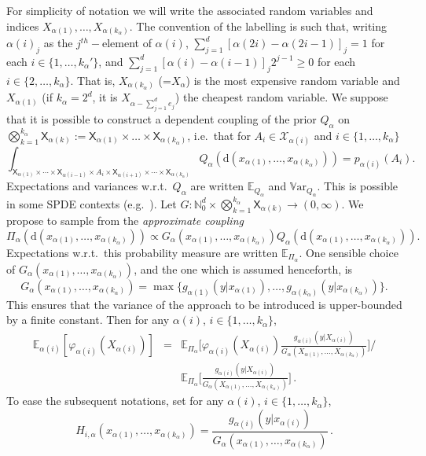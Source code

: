 \documentclass[english]{article}
\newcommand{\dif}{\mathrm{d}}
\begin{document}
For simplicity of notation we will write the associated random variables and indices $X_{\alpha(1)},\dots,X_{\alpha(k_{\alpha})}$.
The convention of the labelling is such that, writing $\alpha(i)_j$ as the $j^{th}-$element of $\alpha(i)$, 
$\sum_{j=1}^d[\alpha(2i)-\alpha(2i-1)]_j=1$ for each $i\in\{1,\dots,k_{\alpha}'\}$, and 
$\sum_{j=1}^d[\alpha(i)-\alpha(i-1)]_j2^{j-1}\geq 0$ for each $i\in\{2,\dots,k_{\alpha}\}$.
That is, $X_{\alpha(k_{\alpha})}$ (=$X_{\alpha}$)
is the most expensive random variable and $X_{\alpha(1)}$ (if $k_{\alpha}=2^d$, it is $X_{\alpha-\sum_{j=1}^d e_j}$) the cheapest random variable.
We suppose that it is possible to construct a dependent coupling of the prior 
$Q_\alpha$ on 
$\bigotimes_{k=1}^{k_{\alpha}} \mathsf{X}_{\alpha(k)} := \mathsf{X}_{\alpha(1)} \times \dots \times \mathsf{X}_{\alpha(k_\alpha)}$,
i.e.~that for $A_i\in\mathcal{X}_{\alpha(i)}$ and $i\in\{1,\dots,k_{\alpha}\}$
$$
\int_{\mathsf{X}_{\alpha(1)}\times\cdots\times\mathsf{X}_{\alpha(i-1)}\times A_i\times 
\mathsf{X}_{\alpha(i+1)}\times\cdots\times\mathsf{X}_{\alpha(k_{\alpha})}} Q_\alpha(\dif (x_{\alpha(1)},\dots,x_{\alpha({k_{\alpha}})})) = 
p_{\alpha(i)}(A_i).
$$
Expectations and variances w.r.t.~$Q_\alpha$ are written $\mathbb{E}_{Q_\alpha}$ and 
$\mathbb{V}\textrm{ar}_{Q_\alpha}$.
This is possible in some SPDE contexts (e.g.~\cite{spde_disc}). 
Let $G:\mathbb{N}_0^d\times \bigotimes_{k=1}^{k_{\alpha}} \mathsf{X}_{\alpha(k)}\rightarrow (0,\infty)$. %
We propose to sample from the {\it approximate coupling} 
$$
\Pi_{\alpha}(\dif (x_{\alpha(1)},\dots,x_{\alpha(k_{\alpha})})) \propto G_{\alpha}(x_{\alpha(1)},\dots,x_{\alpha(k_{\alpha})}) Q_\alpha(\dif (x_{\alpha(1)},\dots,x_{\alpha(k_{\alpha})})).
$$
Expectations w.r.t.~this probability measure are written $\mathbb{E}_{\Pi_{\alpha}}$.
One sensible choice of $G_{\alpha}(x_{\alpha(1)},\dots,x_{\alpha(k_{\alpha})})$, 
and the one which is assumed henceforth, is
$$
G_{\alpha}(x_{\alpha(1)},\dots,x_{\alpha(k_{\alpha})}) = \max\{g_{\alpha(1)}(y|x_{\alpha(1)}),\dots, g_{\alpha(k_{\alpha})}(y|x_{\alpha(k_{\alpha})})\}.
$$
This ensures that the variance of the approach to be introduced is upper-bounded by a finite constant.
Then for any $\alpha(i)$, $i\in\{1,\dots,k_{\alpha}\}$,
\begin{eqnarray}
\mathbb{E}_{\alpha(i)}[\varphi_{\alpha(i)}(X_{\alpha(i)})] & = &
\mathbb{E}_{\Pi_{\alpha}}\Big[\varphi_{\alpha(i)}(X_{\alpha(i)})\frac{g_{\alpha(i)}(y|X_{\alpha(i)})}{G_{\alpha}(X_{\alpha(1)},\dots,X_{\alpha(k_{\alpha})}) }\Big]\Bigg/ \nonumber\\ 
& &
\mathbb{E}_{\Pi_{\alpha}}\Big[
\frac{g_{\alpha(i)}(y|X_{\alpha(i)})}{G_{\alpha}(X_{\alpha(1)},\dots,X_{\alpha(k_{\alpha})}) }\Big] \, .
\label{eq:main_id}
\end{eqnarray}
To ease the subsequent notations, set for any $\alpha(i)$, $i\in\{1,\dots,k_{\alpha}\}$, 
\begin{equation}\label{eq:h}
H_{i,\alpha}(x_{\alpha(1)},\dots,x_{\alpha(k_{\alpha})}) = \frac{g_{\alpha(i)}(y|x_{\alpha(i)})}{G_{\alpha}(x_{\alpha(1)},\dots,x_{\alpha(k_{\alpha})}) } \, .
\end{equation}
\end{document}
